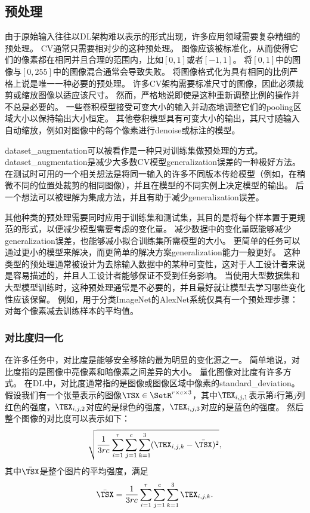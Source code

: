 \subsection{预处理}
\label{sec:preprocessing}

由于原始输入往往以\gls{DL}架构难以表示的形式出现，许多应用领域需要复杂精细的预处理。
\gls{CV}通常只需要相对少的这种预处理。
图像应该被标准化，从而使得它们的像素都在相同并且合理的范围内，比如$[0,1]$或者$[-1,1]$。
将$[0,1]$中的图像与$[0,255]$中的图像混合通常会导致失败。
将图像格式化为具有相同的比例严格上说是唯一一种必要的预处理。
许多\gls{CV}架构需要标准尺寸的图像，因此必须裁剪或缩放图像以适应该尺寸。
然而，严格地说即使是这种重新调整比例的操作并不总是必要的。
一些卷积模型接受可变大小的输入并动态地调整它们的\gls{pooling}区域大小以保持输出大小恒定\citep{Waibel89b}。
其他卷积模型具有可变大小的输出，其尺寸随输入自动缩放，例如对图像中的每个像素进行\gls{denoise}或标注的模型\citep{Hadsell-RSS-07}。

\gls{dataset_augmentation}可以被看作是一种只对训练集做预处理的方式。
\gls{dataset_augmentation}是减少大多数\gls{CV}模型\gls{generalization}误差的一种极好方法。
在测试时可用的一个相关想法是将同一输入的许多不同版本传给模型（例如，在稍微不同的位置处裁剪的相同图像），并且在模型的不同实例上决定模型的输出。
后一个想法可以被理解为集成方法，并且有助于减少\gls{generalization}误差。

其他种类的预处理需要同时应用于训练集和测试集，其目的是将每个样本置于更规范的形式，以便减少模型需要考虑的变化量。
减少数据中的变化量既能够减少\gls{generalization}误差，也能够减小拟合训练集所需模型的大小。
更简单的任务可以通过更小的模型来解决，而更简单的解决方案\gls{generalization}能力一般更好。
这种类型的预处理通常被设计为去除输入数据中的某种可变性，这对于人工设计者来说是容易描述的，并且人工设计者能够保证不受到任务影响。
当使用大型数据集和大型模型训练时，这种预处理通常是不必要的，并且最好就让模型去学习哪些变化性应该保留。
例如，用于分类ImageNet的AlexNet系统仅具有一个预处理步骤：对每个像素减去训练样本的平均值\citep{Krizhevsky-2012}。

\subsubsection{对比度归一化}
\label{sec:contrast_normalization}


在许多任务中，对比度是能够安全移除的最为明显的变化源之一。
简单地说，对比度指的是图像中亮像素和暗像素之间差异的大小。
量化图像对比度有许多方式。
在\gls{DL}中，对比度通常指的是图像或图像区域中像素的\gls{standard_deviation}。
假设我们有一个张量表示的图像$\TSX \in\SetR^{r\times c\times 3}$，其中$\TEX_{i,j,1}$表示第$i$行第$j$列红色的强度，$\TEX_{i,j,2}$对应的是绿色的强度，$\TEX_{i,j,3}$对应的是蓝色的强度。
然后整个图像的对比度可以表示如下：
\begin{align}
\label{eqn:121}
\sqrt{\frac{1}{3rc}\sum_{i=1}^{r} \sum_{j=1}^{c}\sum_{k=1}^{3} (\TEX_{i,j,k} - \bar{\TSX} )^2},
\end{align}
其中$\bar{\TSX}$是整个图片的平均强度，满足
\begin{align}
\label{eqn:122}
 \bar{\TSX} =  \frac{1}{3rc}\sum_{i=1}^{r} \sum_{j=1}^{c}\sum_{k=1}^{3}\TEX_{i,j,k}.
\end{align}


